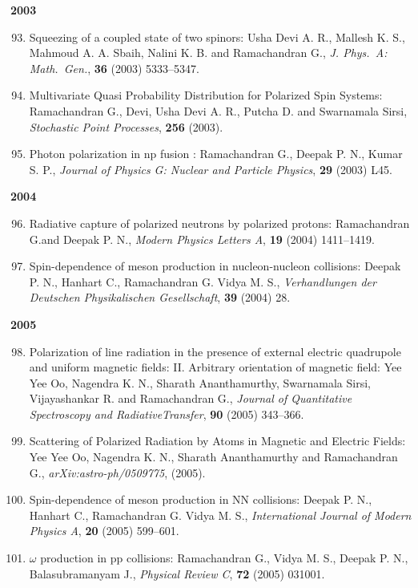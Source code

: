 \textbf{2003}
\begin{enumerate}
\setcounter{enumi}{92}
\item Squeezing of a coupled state of two spinors: Usha Devi A. R., Mallesh K. S., Mahmoud A. A. Sbaih, Nalini K. B. and Ramachandran G., \textit{J. Phys.\ A: Math.\ Gen.}, {\bf 36} (2003) 5333--5347.
\item Multivariate Quasi Probability Distribution for Polarized Spin Systems: Ramachandran G., Devi, Usha Devi A. R., Putcha D. and Swarnamala Sirsi, \textit{Stochastic Point Processes}, {\bf 256} (2003).
\item Photon polarization in np fusion : Ramachandran G., Deepak P. N., Kumar S. P., \textit{Journal of Physics G: Nuclear and Particle Physics}, {\bf 29} (2003) L45.
\end{enumerate}
\textbf{2004}
\begin{enumerate}
\setcounter{enumi}{95}
\item Radiative capture of polarized neutrons by polarized protons: Ramachandran G.and Deepak P. N., \textit{Modern Physics Letters A}, {\bf 19} (2004) 1411--1419.
\item Spin-dependence of meson production in nucleon-nucleon collisions: Deepak P. N., Hanhart C., Ramachandran G. Vidya M. S., \textit{Verhandlungen der Deutschen Physikalischen Gesellschaft}, {\bf 39} (2004) 28.
\end{enumerate}
\textbf{2005}
\begin{enumerate}
\setcounter{enumi}{97}
\item Polarization of line radiation in the presence of external electric quadrupole and uniform magnetic fields: II. Arbitrary orientation of magnetic field: Yee Yee Oo, Nagendra K. N., Sharath Ananthamurthy, Swarnamala Sirsi, Vijayashankar R. and Ramachandran G., \textit{Journal of Quantitative Spectroscopy and Radiative\break Transfer}, {\bf 90} (2005) 343--366.
\item Scattering of Polarized Radiation by Atoms in Magnetic and Electric Fields: Yee Yee Oo, Nagendra K. N., Sharath Ananthamurthy and Ramachandran G., \textit{arXiv:astro-ph/0509775}, (2005).
\item Spin-dependence of meson production in NN collisions: Deepak P. N., Hanhart C., Ramachandran G. Vidya M. S., \textit{International Journal of Modern Physics A}, {\bf 20} (2005) 599--601.
\item $\omega$ production in pp collisions: Ramachandran G., Vidya M. S., Deepak P. N., Balasubramanyam J., \textit{Physical Review C}, {\bf 72} (2005) 031001.
\end{enumerate}
